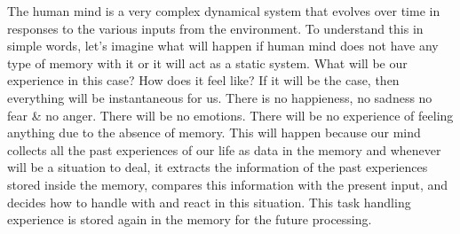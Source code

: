 The human mind is a very complex dynamical system that evolves over time in responses to the various inputs from the environment. To understand this in simple words, let's imagine what will happen if human mind does not have any type of memory with it or it will act as a static system. What will be our experience in this case? How does it feel like? If it will be the case, then everything will be instantaneous for us. There is no happieness, no sadness no fear \& no anger. There will be no emotions. There will be no experience of feeling anything due to the absence of memory. This will happen because our mind collects all the past experiences of our life as data in the memory and whenever will be a situation to deal, it extracts the information of the past experiences stored inside the memory, compares this information with the present input, and decides how to handle with and react in this situation. This task handling experience is stored again in the memory for the future processing.